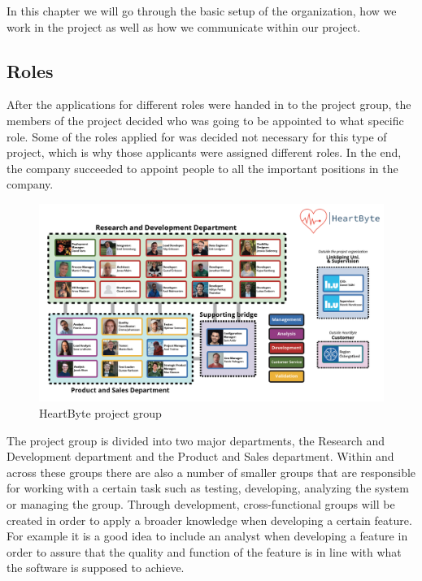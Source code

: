 In this chapter we will go through the basic setup of the organization, how we work in the project as well as how we communicate within our project. 

\subsection{Roles}
After the applications for different roles were handed in to the project group, the members of the project decided who was going to be appointed to what specific role. Some of the roles applied for was decided not necessary for this type of project, which is why those applicants were assigned different roles. In the end, the company succeeded to appoint people to all the important positions in the company. 

\begin{figure}[hbt!]
\centering
\includegraphics[width=\linewidth]{Pictures/MicrosoftTeams-image.png}
\caption{HeartByte project group}
\label{fig:company structure}
\end{figure}

The project group is divided into two major departments, the Research and Development department and the Product and Sales department. Within and across these groups there are also a number of smaller groups that are responsible for working with a certain task such as testing, developing, analyzing the system or managing the group. Through development, cross-functional groups will be created in order to apply a broader knowledge when developing a certain feature. For example it is a good idea to include an analyst when developing a feature in order to assure that the quality and function of the feature is in line with what the software is supposed to achieve. 

